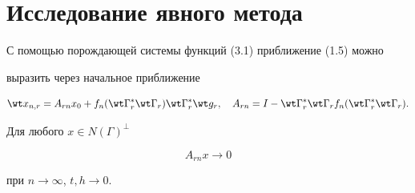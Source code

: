           


\section{Исследование явного метода}





С помощью порождающей системы функций (3.1) приближение (1.5) можно 


выразить через начальное приближение


\begin{equation}


\wt x_{n,r}=A_{rn}x_0+f_n(\wt\Gamma_r^*\wt\Gamma_r)


\wt\Gamma_r^* \wt g_r,\quad


A_{rn}=I-\wt\Gamma_r^*\wt\Gamma_r f_n(\wt \Gamma_r^*\wt\Gamma_r).


\end{equation}








\begin{lem}


Для любого $x\in N(\Gamma)^\bot$


\begin{equation}


A_{rn}x\to 0


\end{equation}


при $n \to \infty$, $t,h\to 0$.


\end{lem} 








